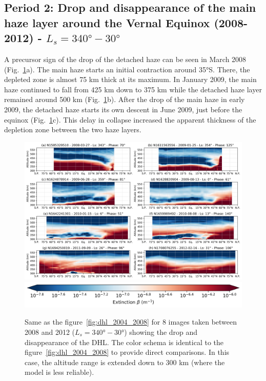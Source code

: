 \subsection{Period 2: Drop and disappearance of the main haze layer around the Vernal Equinox (2008-2012) - $L_s=\ang{340}-\ang{30}$}

A precursor sign of the drop of the detached haze can be seen in March 2008 (Fig.~\ref{fig:dhl_2008_2012}a).
The main haze starts an initial contraction around \ang{35}S. There, the depleted zone is almost
75 km thick at its maximum. In January 2009, the main haze continued to fall from 425 km down to 375 km
while the detached haze layer remained around 500 km (Fig.~\ref{fig:dhl_2008_2012}b). After the drop
of the main haze in early 2009, the detached haze starts its own descent in June 2009, just before the equinox
(Fig.~\ref{fig:dhl_2008_2012}c). This delay in collapse increased the apparent thickness of the depletion
zone between the two haze layers.

\begin{figure}[!ht]
    \centering
    \includegraphics[width=\textwidth]{Fig/Lat_beta-2008_2012.png}
    \includegraphics[width=.5\textwidth]{Fig/Extinction_colorbar.png}\vspace{-.3cm}
    \caption{Same as the figure~\ref{fig:dhl_2004_2008} for 8 images taken between 2008 and 2012
    ($L_s=\ang{340}-\ang{30}$) showing the drop and disappearance of the DHL.
    The color schema is identical to the figure~\ref{fig:dhl_2004_2008} to provide
    direct comparisons. In this case, the altitude range is extended down to 300 km
    (where the model is less reliable).}
    \label{fig:dhl_2008_2012}
\end{figure}

